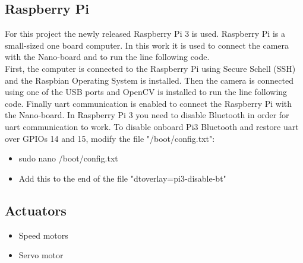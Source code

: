 \documentclass[11pt,twocolumn]{article}
\begin{document}
\subsection{Raspberry Pi}
For this project the newly released Raspberry Pi 3 is used. Raspberry Pi is a small-sized one board computer. In this work it is used to connect the camera with the Nano-board and to run the line following code.\\
First, the computer is connected to the Raspberry Pi using Secure Schell (SSH) and the Raspbian Operating System is installed. Then the camera is connected using one of the USB ports and OpenCV is installed to run the line following code. Finally uart communication is enabled to connect the Raspberry Pi with the Nano-board. In Raspberry Pi 3 you need to disable Bluetooth in order for uart communication to work. To disable onboard Pi3 Bluetooth and restore uart over GPIOs 14 and 15, modify the file "/boot/config.txt":
\begin{itemize}
\item {sudo nano /boot/config.txt}
\item {Add this to the end of the file "dtoverlay=pi3-disable-bt"}
\end{itemize}
\subsection{Actuators}
\begin{itemize}
	\item{Speed motors}
	\item{Servo motor}
\end{itemize}
\end{document}
